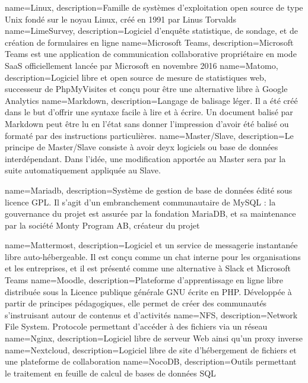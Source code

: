 {
    name=Linux,
    description={Famille de systèmes d'exploitation open source de type Unix fondé sur le noyau Linux, créé en 1991 par Linus Torvalds}
}
{
    name=LimeSurvey,
    description={Logiciel d'enquête statistique, de sondage, et de création de formulaires en ligne}
}
{
    name=Microsoft Teams,
    description={Microsoft Teams est une application de communication collaborative propriétaire en mode SaaS officiellement lancée par Microsoft en novembre 2016}
}
{
    name=Matomo,
    description={Logiciel libre et open source de mesure de statistiques web, successeur de PhpMyVisites et conçu pour être une alternative libre à Google Analytics}
}
{
    name=Markdown,
    description={Langage de balisage léger. Il a été créé dans le but d'offrir une syntaxe facile à lire et à écrire. Un document balisé par Markdown peut être lu en l'état sans donner l’impression d'avoir été balisé ou formaté par des instructions particulières.}
}
{
    name=Master/Slave,
    description={Le principe de Master/Slave consiste à avoir deyx logiciels ou base de données interdépendant. Dans l'idée, une modification apportée au Master sera par la suite automatiquement appliquée au Slave.}
}

{
    name=Mariadb,
    description={Système de gestion de base de données édité sous licence GPL. Il s'agit d'un embranchement communautaire de MySQL : la gouvernance du projet est assurée par la fondation MariaDB, et sa maintenance par la société Monty Program AB, créateur du projet}
}


{
    name=Mattermost,
    description={Logiciel et un service de messagerie instantanée libre auto-hébergeable. Il est conçu comme un chat interne pour les organisations et les entreprises, et il est présenté comme une alternative à Slack et Microsoft Teams}
}
{
    name=Moodle,
    description={Plateforme d'apprentissage en ligne libre distribuée sous la Licence publique générale GNU écrite en PHP. Développée à partir de principes pédagogiques, elle permet de créer des communautés s'instruisant autour de contenus et d'activités}
}
{
    name=NFS,
    description={Network File System. Protocole permettant d'accéder à des fichiers via un réseau}
}
{
    name=Nginx,
    description={Logiciel libre de serveur Web ainsi qu'un proxy inverse}
}
{
    name=Nextcloud,
    description={Logiciel libre de site d'hébergement de fichiers et une plateforme de collaboration}
}
{
    name=NocoDB,
    description={Outils permettant le traitement en feuille de calcul de bases de données SQL}
}

